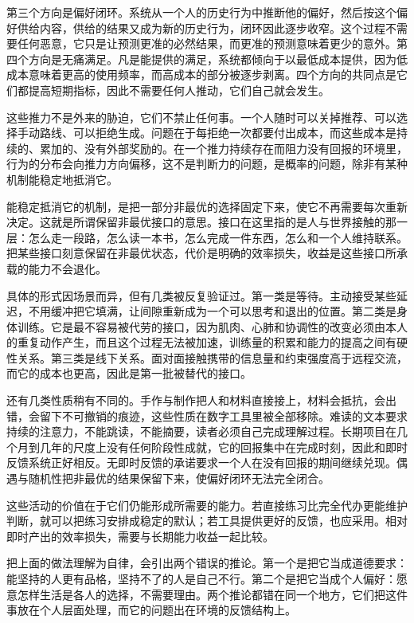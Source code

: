 第三个方向是偏好闭环。系统从一个人的历史行为中推断他的偏好，然后按这个偏好供给内容，供给的结果又成为新的历史行为，闭环因此逐步收窄。这个过程不需要任何恶意，它只是让预测更准的必然结果，而更准的预测意味着更少的意外。第四个方向是无痛满足。凡是能提供的满足，系统都倾向于以最低成本提供，因为低成本意味着更高的使用频率，而高成本的部分被逐步剥离。四个方向的共同点是它们都提高短期指标，因此不需要任何人推动，它们自己就会发生。

这些推力不是外来的胁迫，它们不禁止任何事。一个人随时可以关掉推荐、可以选择手动路线、可以拒绝生成。问题在于每拒绝一次都要付出成本，而这些成本是持续的、累加的、没有外部奖励的。在一个推力持续存在而阻力没有回报的环境里，行为的分布会向推力方向偏移，这不是判断力的问题，是概率的问题，除非有某种机制能稳定地抵消它。


能稳定抵消它的机制，是把一部分非最优的选择固定下来，使它不再需要每次重新决定。这就是所谓保留非最优接口的意思。接口在这里指的是人与世界接触的那一层：怎么走一段路，怎么读一本书，怎么完成一件东西，怎么和一个人维持联系。把某些接口刻意保留在非最优状态，代价是明确的效率损失，收益是这些接口所承载的能力不会退化。

具体的形式因场景而异，但有几类被反复验证过。第一类是等待。主动接受某些延迟，不用缓冲把它填满，让间隙重新成为一个可以思考和退出的位置。第二类是身体训练。它是最不容易被代劳的接口，因为肌肉、心肺和协调性的改变必须由本人的重复动作产生，而且这个过程无法被加速，训练量的积累和能力的提高之间有硬性关系。第三类是线下关系。面对面接触携带的信息量和约束强度高于远程交流，而它的成本也更高，因此是第一批被替代的接口。

还有几类性质稍有不同的。手作与制作把人和材料直接接上，材料会抵抗，会出错，会留下不可撤销的痕迹，这些性质在数字工具里被全部移除。难读的文本要求持续的注意力，不能跳读，不能摘要，读者必须自己完成理解过程。长期项目在几个月到几年的尺度上没有任何阶段性成就，它的回报集中在完成时刻，因此和即时反馈系统正好相反。无即时反馈的承诺要求一个人在没有回报的期间继续兑现。偶遇与随机性把非最优的结果保留下来，使偏好闭环无法完全闭合。

这些活动的价值在于它们仍能形成所需要的能力。若直接练习比完全代办更能维护判断，就可以把练习安排成稳定的默认；若工具提供更好的反馈，也应采用。相对即时产出的效率损失，需要与长期能力收益一起比较。


把上面的做法理解为自律，会引出两个错误的推论。第一个是把它当成道德要求：能坚持的人更有品格，坚持不了的人是自己不行。第二个是把它当成个人偏好：愿意怎样生活是各人的选择，不需要理由。两个推论都错在同一个地方，它们把这件事放在个人层面处理，而它的问题出在环境的反馈结构上。

